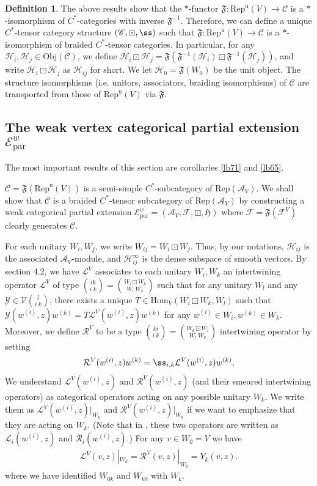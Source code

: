 \documentclass[11pt,b5paper,notitlepage]{article}
\theoremstyle{definition}
\newtheorem{df}{Definition}[subsection]
\theoremstyle{plain}
\newcommand{\fk}{\mathfrak}
\newcommand{\mc}{\mathcal}
\newcommand{\Hom}{\mathrm{Hom}}
\newcommand{\Rep}{\mathrm{Rep}}
\newcommand{\loc}{\mathrm{par}}
\newcommand{\scr}{\mathscr}
\newcommand{\RepuV}{\mathrm{Rep}^{\mathrm u}(V)}
\newcommand{\Obj}{\mathrm{Obj}}
\numberwithin{equation}{subsection}
\begin{document}
\begin{df}\label{lb101}
The above results show that the $*$-functor $\fk F:\RepuV\rightarrow\scr C$ is a $*$-isomorphism of $C^*$-categories with inverse $\fk F^{-1}$. Therefore, we can define a unique$C^*$-tensor category structure $(\scr C,\boxdot,\ss)$ such that $\fk F:\RepuV\rightarrow\scr C$ is a $*$-isomorphism of braided $C^*$-tensor categories. In particular, for any $\mc H_i,\mc H_j\in\Obj(\scr C)$, we define $\mc H_i\boxdot\mc H_j=\fk F(\fk F^{-1}(\mc H_i)\boxdot\fk F^{-1}(\mc H_j))$, and write $\mc H_i\boxdot\mc H_j$ as $\mc H_{ij}$ for short. We let $\mc H_0=\fk F(W_0)$ be the unit object. The structure isomorphisms (i.e. unitors, associators, braiding isomorphisms) of $\scr C$ are transported  from those of $\RepuV$ via $\fk F$.
\end{df}


\subsection{The weak vertex categorical partial extension $\scr E^w_\loc$}\label{lb68}


The most important results of this section are corollaries \ref{lb71} and \ref{lb65}.




$\scr C=\fk F(\RepuV)$ is a semi-simple $C^*$-subcategory of $\Rep(\mc A_V)$. We shall show that $\scr C$ is a braided $C^*$-tensor subcategory of $\Rep(\mc A_V)$ by constructing a weak categorical partial extension $\scr E^w_\loc=(\mc A_V,\mc F,\boxdot,\fk H)$ where $\mc F=\fk F(\mc F^V)$ clearly generates $\scr C$.

For each unitary $W_i,W_j$, we write $W_{ij}=W_i\boxdot W_j$. Thus, by our notations, $\mc H_{ij}$ is the associated $\mc A_V$-module, and $\mc H_{ij}^\infty$ is the dense subspace of smooth vectors. By \cite{Gui21a} section 4.2, we have $\mc L^V$ associates to each unitary $W_i,W_k$  an intertwining operator $\mc L^V$ of type ${ik\choose i~k}={W_i\boxdot W_k\choose W_i~W_k}$ such that for any unitary $W_l$ and any $\mc Y\in\mc V{l\choose i~k}$, there exists a unique $T\in\Hom_V(W_i\boxdot W_k,W_l)$ such that $\mc Y(w^{(i)},z)w^{(k)}=T\mc L^V(w^{(i)},z)w^{(k)}$ for any $w^{(i)}\in W_i,w^{(k)}\in W_k$. Moreover,  we define $\mc R^V$ to be a type ${ki\choose i~k}={W_k\boxdot W_i\choose W_i~W_k}$ intertwining operator by setting
\begin{align}
\mc R^V(w^{(i)},z)w^{(k)}=\ss_{i,k}\mc L^V(w^{(i)},z)w^{(k)},
\end{align}
We understand $\mc L^V(w^{(i)},z)$ and $\mc R^V(w^{(i)},z)$ (and their smeared intertwining operators) as categorical operators acting on any possible unitary $W_k$. We write them as $\mc L^V(w^{(i)},z)|_{W_k}$ and $\mc R^V(w^{(i)},z)|_{W_k}$ if we want to emphasize that they are acting on $W_k$. (Note that in \cite{Gui21a}, these two operators are written as $\mc L_i(w^{(i)},z)$ and $\mc R_i(w^{(i)},z)$.) For any $v\in W_0=V$ we have
\begin{align}
\mc L^V(v,z)|_{W_k}=\mc R^V(v,z)|_{W_k}=Y_k(v,z).
\end{align}
where we have identified $W_{0k}$ and $W_{k0}$ with $W_k$.
\end{document}
